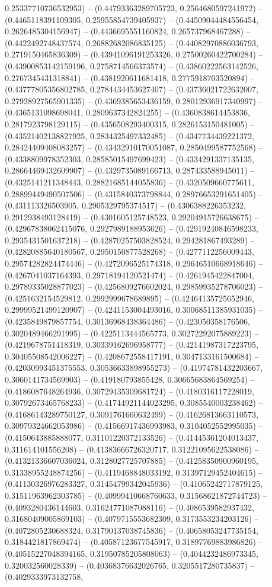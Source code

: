 0.25337710736532953) -- (0.44793363289705723, 0.2564680597241972) -- (0.4465118391109305, 0.25955854739405937) -- (0.44509044484556454, 0.2626485304156947) -- (0.4436695551160824, 0.265737968467288) -- (0.4422492748437574, 0.26882682086835125) -- (0.44082970886036793, 0.2719150465836309) -- (0.43941096191253326, 0.27500260422700284) -- (0.43900853142159196, 0.2758714566373574) -- (0.43860222563142526, 0.2767345431318841) -- (0.4381920611681418, 0.2775918703520894) -- (0.43777805356802785, 0.2784434453627407) -- (0.43736021722632007, 0.27928927565901335) -- (0.4369385653436159, 0.28012936917340997) -- (0.4365131098698041, 0.2809637342824255) -- (0.4360838614453836, 0.2817923798129115) -- (0.4356508293400315, 0.2826153150481005) -- (0.43521402138827925, 0.2834325497332485) -- (0.4347734439221372, 0.28424409408083257) -- (0.43432910170051087, 0.2850499587752568) -- (0.4338809978352303, 0.28585015497699423) -- (0.4334291337135135, 0.28664469432609907) -- (0.4329735089166713, 0.287433588945011) -- (0.4325141211348443, 0.28821685144055836) -- (0.4320509660775611, 0.28899449490507506) -- (0.4315840373798844, 0.28976653291651405) -- (0.431113326503905, 0.2905329795374517) -- (0.4306388226353232, 0.2912938493128419) -- (0.4301605125748523, 0.29204915726638675) -- (0.42967838062415076, 0.2927989188953626) -- (0.42919240846598233, 0.2935431501637218) -- (0.42870257503828524, 0.294281867493289) -- (0.42820885640180567, 0.2950150877528268) -- (0.4277112256009443, 0.29574282824474446) -- (0.4272096525174318, 0.29646510668918646) -- (0.4267041037164393, 0.29718194120521474) -- (0.4261945422847004, 0.29789335028877023) -- (0.4256809276602024, 0.29859935278706023) -- (0.4251632154529812, 0.2992999678689895) -- (0.42464135725652946, 0.29999521499120907) -- (0.4241153004493016, 0.30068511385931035) -- (0.4235849879857754, 0.30136968438364486) -- (0.423050358176506, 0.3020489466291995) -- (0.4225113444565773, 0.30272292075889223) -- (0.4219678751418319, 0.30339162696958777) -- (0.42141987317223795, 0.30405508542006227) -- (0.4208672558417191, 0.3047133161500684) -- (0.42030993451375553, 0.30536633898955273) -- (0.41974781432203667, 0.3060141734569903) -- (0.419180793855428, 0.30665683864569254) -- (0.4186087648264936, 0.30729435309681724) -- (0.4180316117228019, 0.30792673465768233) -- (0.41744921144023295, 0.3085540003238462) -- (0.41686143289750127, 0.3091761660632499) -- (0.41626813663110573, 0.30979324662053986) -- (0.41566917436993983, 0.3104052552995035) -- (0.4150643885888077, 0.31101220372133526) -- (0.41445361204013437, 0.311614101556208) -- (0.41383666726320717, 0.31221095622538086) -- (0.41321336607036024, 0.3128027725707885) -- (0.41258350900960195, 0.31338955248874256) -- (0.4119468848033192, 0.31397129452404615) -- (0.41130326976283327, 0.31454799342045936) -- (0.41065242717879125, 0.31511963962303785) -- (0.40999410668760633, 0.31568621872744723) -- (0.4093280436144603, 0.31624771087088116) -- (0.4086539582937432, 0.31680409005869103) -- (0.4079715553682309, 0.3173553234203126) -- (0.4072805230688324, 0.31790137038745836) -- (0.40658053247735154, 0.3184421817869474) -- (0.40587123677545917, 0.31897769883986826) -- (0.40515227048394165, 0.31950785205808063) -- (0.4044232486973345, 0.320032560028339) -- (0.40368376632026765, 0.3205517280735837) -- (0.4029333973132758, 